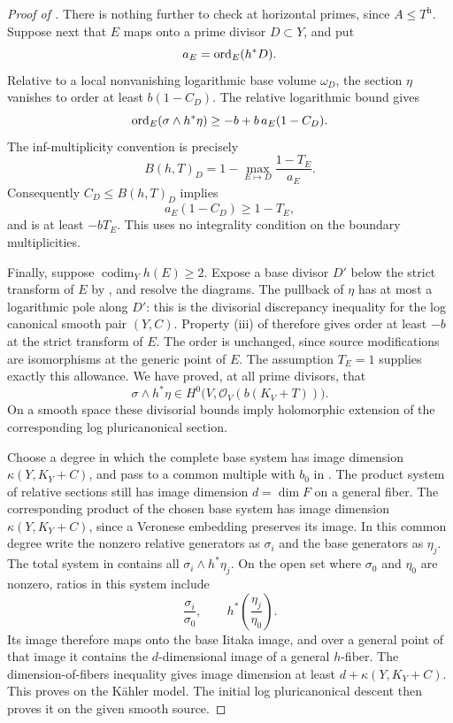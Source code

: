 \begin{proof}[Proof of ]
There is nothing further to check at horizontal primes, since
\(A\leq T^{\mathrm h}\).  Suppose next that \(E\) maps onto a
prime divisor \(D\subset Y\), and put
\[
  a_E=\operatorname{ord}_E(h^*D).
\]
Relative to a local nonvanishing logarithmic base volume
\(\omega_D\), the section \(\eta\) vanishes to order at least
\(b(1-C_D)\).  The relative logarithmic bound gives
\begin{equation}\label{generaltype:orbifold-order}
  \operatorname{ord}_E(\sigma\wedge h^*\eta)
        \geq -b+b\,a_E(1-C_D).
\end{equation}
The inf-multiplicity convention is precisely
\[
 B(h,T)_D
   =1-\max_{E\mapsto D}\frac{1-T_E}{a_E}.
\]
Consequently \(C_D\leq B(h,T)_D\) implies
\[
 a_E(1-C_D)\geq1-T_E,
\]
and  is at least \(-bT_E\).
This uses no integrality condition on the boundary multiplicities.

Finally, suppose \(\operatorname{codim}_Y h(E)\geq2\).
Expose a base divisor \(D'\) below the strict transform of \(E\)
by , and resolve the diagrams.
The pullback of \(\eta\) has at most a logarithmic pole along
\(D'\): this is the divisorial discrepancy inequality for the
log canonical smooth pair \((Y,C)\).
Property (iii) of  therefore
gives order at least \(-b\) at the strict transform of \(E\).
The order is unchanged, since source modifications are isomorphisms
at the generic point of \(E\).
The assumption \(T_E=1\) supplies exactly this allowance.
We have proved, at all prime divisors, that
\begin{equation}\label{generaltype:product-sections}
 \sigma\wedge h^*\eta
       \in H^0\bigl(V,\mathcal O_V(b(K_V+T))\bigr).
\end{equation}
On a smooth space these divisorial bounds imply holomorphic
extension of the corresponding log pluricanonical section.

Choose a degree in which the complete base system has image
dimension \(\kappa(Y,K_Y+C)\), and pass to a common multiple
with \(b_0\) in .
The product system of relative sections still has image dimension
\(d=\dim F\) on a general fiber.  The corresponding product of the
chosen base system has image dimension \(\kappa(Y,K_Y+C)\), since a
Veronese embedding preserves its image.  In this common degree write
the nonzero relative generators as \(\sigma_i\) and the base
generators as \(\eta_j\).
The total system in  contains
all \(\sigma_i\wedge h^*\eta_j\).
On the open set where \(\sigma_0\) and \(\eta_0\) are nonzero,
ratios in this system include
\[
  \frac{\sigma_i}{\sigma_0},
  \qquad
  h^*\!\left(\frac{\eta_j}{\eta_0}\right).
\]
Its image therefore maps onto the base Iitaka image, and over
a general point of that image it contains the \(d\)-dimensional
image of a general \(h\)-fiber.
The dimension-of-fibers inequality gives image dimension at
least \(d+\kappa(Y,K_Y+C)\).  This proves
 on the Kähler model.
The initial log pluricanonical descent then proves it on the
given smooth source.
\end{proof}
